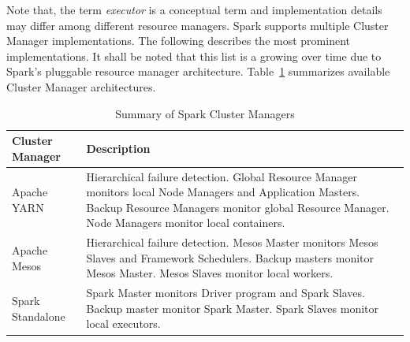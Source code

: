 Note that, the term \emph{executor} is a conceptual term and implementation details may differ among different resource managers. Spark supports multiple Cluster Manager implementations. The following describes the most prominent implementations. It shall be noted that this list is a growing over time due to Spark's pluggable resource manager architecture. Table~\ref{tab:spark-cluster} summarizes available Cluster Manager architectures.
\begin{table}[!htp]
    \begin{tabularx}{\textwidth}{lX}
        \toprule
        \textbf{Cluster Manager} & \textbf{Description}\\
        \midrule
        Apache YARN & Hierarchical failure detection. Global Resource Manager monitors local Node Managers and Application Masters. Backup Resource Managers monitor global Resource Manager. Node Managers monitor local containers.\\
        Apache Mesos & Hierarchical failure detection. Mesos Master monitors Mesos Slaves and Framework Schedulers. Backup masters monitor Mesos Master. Mesos Slaves monitor local workers.\\
        Spark Standalone & Spark Master monitors Driver program and Spark Slaves. Backup master monitor Spark Master. Spark Slaves monitor local executors.\\
        \bottomrule
    \end{tabularx}
    \centering
    \caption{Summary of Spark Cluster Managers}
    \label{tab:spark-cluster}
\end{table}
